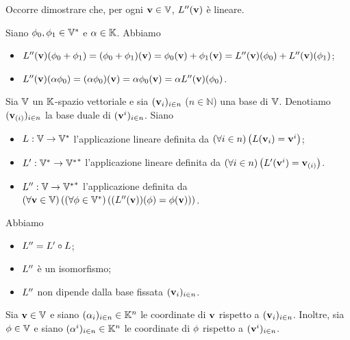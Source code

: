 \Proof Occorre dimostrare che, per ogni $\mathbf{v} \in \mathbb{V}$, $L''(\mathbf{v})$ \`e lineare.
\par Siano $\phi_0, \phi_1 \in {{\mathbb{V}}^*}$ e $\alpha \in \mathbb{K}$. Abbiamo
\begin{itemize}
	\item $L''(\mathbf{v})(\phi_0 + \phi_1) = (\phi_0 + \phi_1)(\mathbf{v}) = \phi_0(\mathbf{v}) + \phi_1(\mathbf{v}) = L''(\mathbf{v})(\phi_0) + L''(\mathbf{v})(\phi_1)$;
	\item $L''(\mathbf{v})(\alpha \phi_0) = (\alpha \phi_0)(\mathbf{v}) = \alpha \phi_0(\mathbf{v}) = \alpha L''(\mathbf{v})(\phi_0)$. \EndProof
\end{itemize} 
\begin{Theorem}
	Sia $\mathbb{V}$ un $\mathbb{K}$-spazio vettoriale e sia $(\mathbf{v}_i)_{i \in n}$ ($n \in \mathbb{N}$) una base di $\mathbb{V}$. Denotiamo $(\mathbf{v}_{(i)})_{i \in n}$ la base duale di $(\mathbf{v}^i)_{i \in n}$. Siano
	\begin{itemize}
		\item $L: \mathbb{V} \rightarrow {{\mathbb{V}}^*}$ l'applicazione lineare definita da $\left ( \forall i \in n \right ) \left ( L(\mathbf{v}_i) = \mathbf{v}^i \right )$;
		\item $L': {{\mathbb{V}}^*} \rightarrow {{{{\mathbb{V}}^*}}^*}$ l'applicazione lineare definita da $\left ( \forall i \in n \right ) \left ( L'(\mathbf{v}^i) = \mathbf{v}_{(i)} \right )$.
		\item $L'': \mathbb{V} \rightarrow {{{{\mathbb{V}}^*}}^*}$ l'applicazione definita da $\left ( \forall \mathbf{v} \in \mathbb{V} \right ) \left ( \left ( \forall \phi \in {{\mathbb{V}}^*} \right ) \left ( {(L''(\mathbf{v}))(\phi) = \phi(\mathbf{v})} \right ) \right )$.
	\end{itemize}
	Abbiamo
	\begin{itemize}
		\item $L'' = L' \circ L$;
		\item $L''$ \`e un isomorfismo;
		\item $L''$ non dipende dalla base fissata $(\mathbf{v}_i)_{i \in n}$.
	\end{itemize}
\end{Theorem}
\Proof Sia $\mathbf{v} \in \mathbb{V}$ e siano $(\alpha_i)_{i \in n} \in \mathbb{K}^n$ le coordinate di $\mathbf{v}$ rispetto a $(\mathbf{v}_i)_{i \in n}$. Inoltre, sia $\phi \in \mathbb{V}$ e siano $(\alpha^i)_{i \in n} \in \mathbb{K}^n$ le coordinate di $\phi$ rispetto a $(\mathbf{v}^i)_{i \in n}$.

